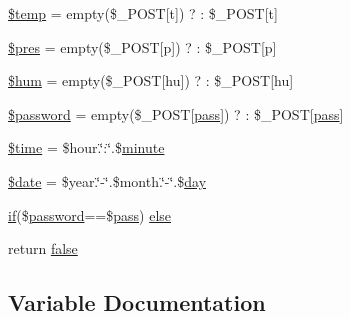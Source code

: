 \begin{DoxyCompactItemize}
\item 
\hyperlink{import_8php_a0d57fb0317e19ec798aa625381ebf342}{\$temp} = empty(\$\+\_\+\+P\+O\+ST\mbox{[}\textquotesingle{}t\textquotesingle{}\mbox{]}) ? \textquotesingle{}\textquotesingle{} \+: \$\+\_\+\+P\+O\+ST\mbox{[}\textquotesingle{}t\textquotesingle{}\mbox{]}
\item 
\hyperlink{import_8php_a829cc53a4b993d7a7eefdcc9ae1d2e10}{\$pres} = empty(\$\+\_\+\+P\+O\+ST\mbox{[}\textquotesingle{}p\textquotesingle{}\mbox{]}) ? \textquotesingle{}\textquotesingle{} \+: \$\+\_\+\+P\+O\+ST\mbox{[}\textquotesingle{}p\textquotesingle{}\mbox{]}
\item 
\hyperlink{import_8php_a0c87ad8226d1badaa73904d159666bd3}{\$hum} = empty(\$\+\_\+\+P\+O\+ST\mbox{[}\textquotesingle{}hu\textquotesingle{}\mbox{]}) ? \textquotesingle{}\textquotesingle{} \+: \$\+\_\+\+P\+O\+ST\mbox{[}\textquotesingle{}hu\textquotesingle{}\mbox{]}
\item 
\hyperlink{import_8php_a607686ef9f99ea7c42f4f3dd3dbb2b0d}{\$password} = empty(\$\+\_\+\+P\+O\+ST\mbox{[}\textquotesingle{}\hyperlink{_time_n_t_p___e_s_p8266_wi_fi_8ino_a5a1325b7c2160dc5aebb1259a2fd1094}{pass}\textquotesingle{}\mbox{]}) ? \textquotesingle{}\textquotesingle{} \+: \$\+\_\+\+P\+O\+ST\mbox{[}\textquotesingle{}\hyperlink{_time_n_t_p___e_s_p8266_wi_fi_8ino_a5a1325b7c2160dc5aebb1259a2fd1094}{pass}\textquotesingle{}\mbox{]}
\item 
\hyperlink{import_8php_a78db1a0602e3b6ac1d9a1b5ec103c160}{\$time} = \$hour.\char`\"{}\+:\char`\"{}.\$\hyperlink{_time_8cpp_a88285e3771bcb970424122a6ee4b40fa}{minute}
\item 
\hyperlink{import_8php_a481c918f8d853749e00b5942cabf599a}{\$date} = \$year.\char`\"{}-\/\char`\"{}.\$month.\char`\"{}-\/\char`\"{}.\$\hyperlink{_time_8cpp_a51dcd9f072551ba8f47449a4e7f78c29}{day}
\item 
\hyperlink{index_8php_a5bd83a7a52ff3be468b16a8c82e43673}{if}(\$\hyperlink{_w_s_8ino_ae59dfb8ffddb9128834034516c45e7ce}{password}==\$\hyperlink{_time_n_t_p___e_s_p8266_wi_fi_8ino_a5a1325b7c2160dc5aebb1259a2fd1094}{pass}) \hyperlink{import_8php_aaa4356675ab2316ef55b1dffd0ff7b3f}{else}
\item 
return \hyperlink{import_8php_a5df37b7f02e5cdc7d9412b7f872b8e01}{false}
\end{DoxyCompactItemize}


\subsection{Variable Documentation}
\mbox{\label{import_8php_aa8a5a87b9c1a6a0819b88447cbe41877}} 
